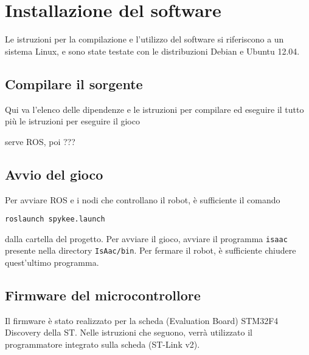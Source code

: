 \chapter{Installazione del software}
\label{cap:installazione}

Le istruzioni per la compilazione e l'utilizzo del software si riferiscono a un sistema Linux, e sono state testate con le distribuzioni Debian e Ubuntu 12.04.

\section{Compilare il sorgente}

Qui va l'elenco delle dipendenze e le istruzioni per compilare ed eseguire il tutto più
le istruzioni per eseguire il gioco

serve ROS, poi ???

\section{Avvio del gioco}

Per avviare ROS e i nodi che controllano il robot, è sufficiente il comando
\begin{verbatim}
roslaunch spykee.launch
\end{verbatim}
dalla cartella del progetto. Per avviare il gioco, avviare il programma \verb|isaac| presente nella directory \verb|IsAac/bin|. Per fermare il robot, è sufficiente chiudere quest'ultimo programma.

\section{Firmware del microcontrollore}

Il firmware è stato realizzato per la scheda (Evaluation Board) STM32F4 Discovery della ST. Nelle istruzioni che seguono, verrà utilizzato il programmatore integrato sulla scheda (ST-Link v2).

